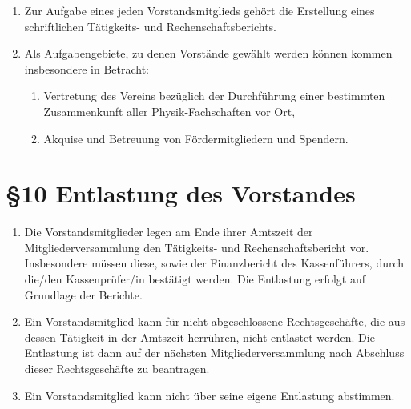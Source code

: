 \documentclass[11pt,ngerman]{article}
\begin{document}
\begin{enumerate}
 \item Zur Aufgabe eines jeden Vorstandsmitglieds gehört die Erstellung eines schriftlichen Tätigkeits- und Rechenschaftsberichts.

  \item Als Aufgabengebiete, zu denen Vorstände gewählt werden können kommen insbesondere in Betracht:
  \begin{enumerate}
   \item Vertretung des Vereins bezüglich der Durchführung einer bestimmten Zusammenkunft aller Physik-Fachschaften vor Ort,
   \item Akquise und Betreuung von Fördermitgliedern und Spendern.
  \end{enumerate}
\end{enumerate}

\newpage

\section*{§10 Entlastung des Vorstandes}
\begin{enumerate}
	\item Die Vorstandsmitglieder legen am Ende ihrer Amtszeit der Mitgliederversammlung den Tätigkeits- und Rechenschaftsbericht vor.
	Insbesondere müssen diese, sowie der Finanzbericht des Kassenführers, durch die/den Kassenprüfer/in bestätigt werden.
	Die Entlastung erfolgt auf Grundlage der Berichte.
	\item Ein Vorstandsmitglied kann für nicht abgeschlossene Rechtsgeschäfte, die aus dessen Tätigkeit in der Amtszeit herrühren, nicht entlastet werden. Die Entlastung ist dann auf der nächsten Mitgliederversammlung nach Abschluss dieser Rechtsgeschäfte zu beantragen.
	\item Ein Vorstandsmitglied kann nicht über seine eigene Entlastung abstimmen.
\end{enumerate}
\end{document}
